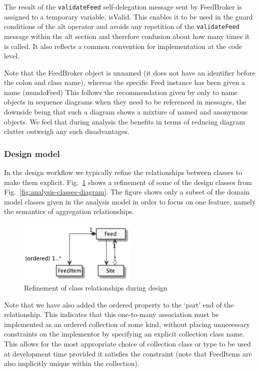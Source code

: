\documentclass[runningheads,a4paper]{llncs}
\begin{document}
The result of the \texttt{validateFeed} self-delegation message sent by \textsf{FeedBroker} is assigned to a temporary variable, \textsf{isValid}. This enables it to be used in the guard conditions of the \textsf{alt} operator and avoids any repetition of the \texttt{validateFeed} message within the \textsf{alt} section and therefore confusion about how many times it is called. It also reflects a common convention for implementation at the code level.

Note that the \textsf{FeedBroker} object is unnamed (it does not have an identifier before the colon and class name), whereas the specific \textsf{Feed} instance has been given a name (\textsf{mundoFeed}) This follows the recommendation given by \cite{ambler} only to name objects in sequence diagrams when they need to be referenced in messages, the downside being that such a diagram shows a mixture of named and anonymous objects. We feel that during analysis the benefits in terms of reducing diagram clutter outweigh any such disadvantages.


\subsubsection{Design model}

In the design workflow we typically refine the relationships between classes to make them explicit. Fig.~\ref{fig:design-classes-diagram} shows a refinement of some of the design classes from Fig.~\ref{fig:analysis-classes-diagram}. The figure shows only a subset of the domain model classes given in the analysis model in order to focus on one feature, namely the semantics of aggregation relationships.

\begin{figure}
\centering
\includegraphics[width=0.5\textwidth]{design-classes}
\caption{Refinement of class relationships during design}
\label{fig:design-classes-diagram}
\end{figure}

Note that we have also added the \textsf{ordered} property to the `part' end of the relationship. This indicates that this one-to-many association must be implemented as an ordered collection of some kind, without placing unnecessary constraints on the implementor by specifying an explicit collection class name. This allows for the most appropriate choice of collection class or type to be used at development time provided it satisfies the constraint (note that \textsf{FeedItem}s are also implicitly unique within the collection).
\end{document}
